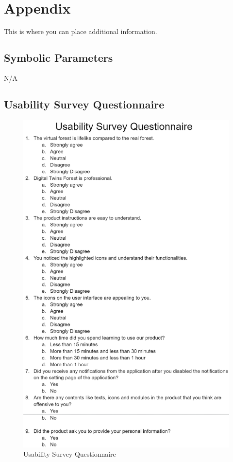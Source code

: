 \documentclass[12pt, titlepage]{article}
\begin{document}
\newpage

\section{Appendix}

This is where you can place additional information.

\subsection{Symbolic Parameters}
N/A

\subsection{Usability Survey Questionnaire}
\begin{figure}[H]
    \centering
    \includegraphics[scale = 0.9]{VnV_Pictures/Usability Survey Quesntionnarie.png}
    \caption{Usability Survey Questionnaire}
\end{figure}
\end{document}
